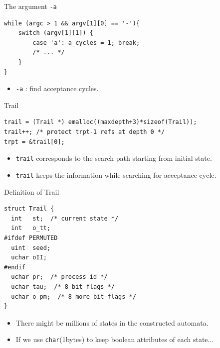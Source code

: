 \documentclass[12pt]{beamer}
\newcommand{\code}[1]{\texttt{#1}}
\begin{document}
\begin{frame}[fragile]{The argument \code{-a}}
\begin{lstlisting}[basicstyle=\normalsize\ttfamily]
while (argc > 1 && argv[1][0] == '-'){ 
    switch (argv[1][1]) {
        case 'a': a_cycles = 1; break;
        /* ... */
    }
}\end{lstlisting}
 	\begin{itemize}
 		\item \code{-a} : find acceptance cycles.
 	\end{itemize}
\end{frame}  


\begin{frame}[fragile]{Trail}
\begin{lstlisting}[basicstyle=\normalsize\ttfamily]
trail = (Trail *) emalloc((maxdepth+3)*sizeof(Trail));
trail++; /* protect trpt-1 refs at depth 0 */
trpt = &trail[0];
\end{lstlisting}
 	\begin{itemize}
		\item \code{trail} corresponds to the search path starting from initial state.
 		\item \code{trail} keeps the information while searching for acceptance cycle.
 	\end{itemize}
\end{frame}

\begin{frame}[fragile]{Definition of Trail}
\begin{lstlisting}[basicstyle=\normalsize\ttfamily]
struct Trail {
  int   st;  /* current state */
  int   o_tt;
#ifdef PERMUTED
  uint  seed;
  uchar oII;
#endif
  uchar pr;  /* process id */
  uchar tau;  /* 8 bit-flags */
  uchar o_pm;  /* 8 more bit-flags */
}
\end{lstlisting}
\begin{itemize}
	\item There might be millions of states in the constructed automata.
	\item If we use \code{char}(1bytes) to keep boolean attributes of each state...
\end{itemize}
\end{frame}
\end{document}
